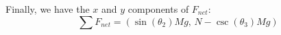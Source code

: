 \documentclass{article}
\begin{document}
Finally, we have the $x$ and $y$ components of $F_{net}$:
\[ \boxed{\sum F_{net} = (\sin(\theta_2)Mg, \, N-\csc(\theta_3)Mg)} \]


\end{document}
